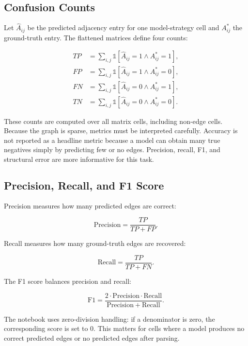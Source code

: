 \subsection{Confusion Counts}

Let \(\hat{A}_{ij}\) be the predicted adjacency entry for one model-strategy
cell and \(A^\ast_{ij}\) the ground-truth entry. The flattened matrices define
four counts:

\begin{align}
  TP &= \sum_{i,j} \mathbb{1}[\hat{A}_{ij}=1 \wedge A^\ast_{ij}=1],\\
  FP &= \sum_{i,j} \mathbb{1}[\hat{A}_{ij}=1 \wedge A^\ast_{ij}=0],\\
  FN &= \sum_{i,j} \mathbb{1}[\hat{A}_{ij}=0 \wedge A^\ast_{ij}=1],\\
  TN &= \sum_{i,j} \mathbb{1}[\hat{A}_{ij}=0 \wedge A^\ast_{ij}=0].
\end{align}

These counts are computed over all matrix cells, including non-edge cells.
Because the graph is sparse, metrics must be interpreted carefully. Accuracy
is not reported as a headline metric because a model can obtain many true
negatives simply by predicting few or no edges. Precision, recall, F1, and
structural error are more informative for this task.

\subsection{Precision, Recall, and F1 Score}

Precision measures how many predicted edges are correct:

\begin{equation}
  \mathrm{Precision} = \frac{TP}{TP + FP}.
\end{equation}

Recall measures how many ground-truth edges are recovered:

\begin{equation}
  \mathrm{Recall} = \frac{TP}{TP + FN}.
\end{equation}

The F1 score balances precision and recall:

\begin{equation}
  \mathrm{F1} =
  \frac{2 \cdot \mathrm{Precision} \cdot \mathrm{Recall}}
       {\mathrm{Precision} + \mathrm{Recall}}.
\end{equation}

The notebook uses zero-division handling: if a denominator is zero, the
corresponding score is set to 0. This matters for cells where a model produces
no correct predicted edges or no predicted edges after parsing.


